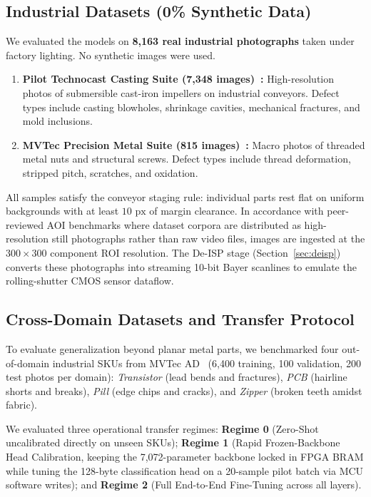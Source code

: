 \documentclass[conference]{IEEEtran}
\begin{document}
\subsection{Industrial Datasets (0\% Synthetic Data)}
We evaluated the models on \textbf{8,163 real industrial photographs} taken under factory lighting. No synthetic images were used.
\begin{enumerate}
    \item \textbf{Pilot Technocast Casting Suite (7,348 images)~\cite{pilot2020casting}:} High-resolution photos of submersible cast-iron impellers on industrial conveyors. Defect types include casting blowholes, shrinkage cavities, mechanical fractures, and mold inclusions.
    \item \textbf{MVTec Precision Metal Suite (815 images)~\cite{bergmann2019mvtec}:} Macro photos of threaded metal nuts and structural screws. Defect types include thread deformation, stripped pitch, scratches, and oxidation.
\end{enumerate}
All samples satisfy the conveyor staging rule: individual parts rest flat on uniform backgrounds with at least $10\text{ px}$ of margin clearance. In accordance with peer-reviewed AOI benchmarks where dataset corpora are distributed as high-resolution still photographs rather than raw video files, images are ingested at the $300 \times 300$ component ROI resolution. The De-ISP stage (Section~\ref{sec:deisp}) converts these photographs into streaming 10-bit Bayer scanlines to emulate the rolling-shutter CMOS sensor dataflow.

\subsection{Cross-Domain Datasets and Transfer Protocol}
To evaluate generalization beyond planar metal parts, we benchmarked four out-of-domain industrial SKUs from MVTec AD~\cite{bergmann2019mvtec} (6,400 training, 100 validation, 200 test photos per domain): \textit{Transistor} (lead bends and fractures), \textit{PCB} (hairline shorts and breaks), \textit{Pill} (edge chips and cracks), and \textit{Zipper} (broken teeth amidst fabric). 

We evaluated three operational transfer regimes: \textbf{Regime 0} (Zero-Shot uncalibrated directly on unseen SKUs); \textbf{Regime 1} (Rapid Frozen-Backbone Head Calibration, keeping the 7,072-parameter backbone locked in FPGA BRAM while tuning the 128-byte classification head on a 20-sample pilot batch via MCU software writes); and \textbf{Regime 2} (Full End-to-End Fine-Tuning across all layers).
\end{document}
